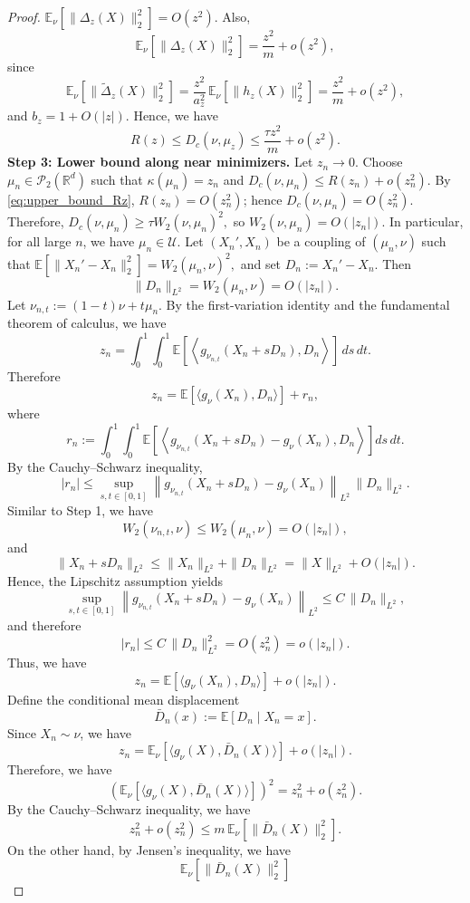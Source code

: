 \documentclass[11pt]{article}
\theoremstyle{definition}
\newcommand{\E}{\mathbb{E}}
\begin{document}
\begin{proof}
{\(\E_\nu[\|\Delta_z(X)\|_2^2]=O(z^2)\). Also,
\[
\E_\nu[\|\Delta_z(X)\|_2^2]
=
\frac{z^2}{m}+o(z^2),
\]
since
\[
\E_\nu[\|\widetilde\Delta_z(X)\|_2^2]
=
\frac{z^2}{a_z^2}\,\E_\nu[\|h_z(X)\|_2^2]
=
\frac{z^2}{m}+o(z^2),
\]
and \(b_z=1+O(|z|)\). Hence, we have
\begin{equation}
\label{eq:upper_bound_Rz}
R(z)\le D_c(\nu,\mu_z)
\le
\frac{\tau z^2}{m}+o(z^2).
\end{equation}
\medskip
\noindent
\textbf{Step 3: Lower bound along near minimizers.}
Let \(z_n\to0\). Choose \(\mu_n\in \mathcal P_2(\mathbb R^d)\) such that $\kappa(\mu_n)=z_n$ and $D_c(\nu,\mu_n)\le R(z_n)+o(z_n^2).$
By \eqref{eq:upper_bound_Rz}, $R(z_n)=O(z_n^2)$; 
hence $D_c(\nu,\mu_n)=O(z_n^2).$
Therefore, $D_c(\nu,\mu_n)\ge \tau W_2(\nu,\mu_n)^2,$
so $W_2(\nu,\mu_n)=O(|z_n|).$
In particular, for all large \(n\), we have \(\mu_n\in \mathcal U\).
Let \((X_n',X_n)\) be a coupling of \((\mu_n,\nu)\) such that $\E[\|X_n'-X_n\|_2^2]=W_2(\mu_n,\nu)^2,$
and set $D_n:=X_n'-X_n.$
Then
\[
\|D_n\|_{L^2}=W_2(\mu_n,\nu)=O(|z_n|).
\]
Let \(\nu_{n,t}:=(1-t)\nu+t\mu_n\). By the first-variation identity and the fundamental theorem
of calculus, we have 
\[
z_n
=
\int_0^1\int_0^1
\E\!\left[\left\langle g_{\nu_{n,t}}(X_n+sD_n),D_n\right\rangle\right]\,ds\,dt.
\]
Therefore
\[
z_n
=
\E\!\left[\langle g_\nu(X_n),D_n\rangle\right] + r_n,
\]
where
\[
r_n
:=
\int_0^1\int_0^1
\E\!\left[
\left\langle g_{\nu_{n,t}}(X_n+sD_n)-g_\nu(X_n),D_n\right\rangle
\right]ds\,dt.
\]
By the Cauchy--Schwarz inequality,
\[
|r_n|
\le
\sup_{s,t\in[0,1]}
\left\|g_{\nu_{n,t}}(X_n+sD_n)-g_\nu(X_n)\right\|_{L^2}
\,
\|D_n\|_{L^2}.
\]
Similar to Step 1, we have 
\[
W_2(\nu_{n,t},\nu)\le W_2(\mu_n,\nu)=O(|z_n|),
\]
and
\[
\|X_n+sD_n\|_{L^2}
\le
\|X_n\|_{L^2}+\|D_n\|_{L^2}
=
\|X\|_{L^2}+O(|z_n|).
\]
Hence, the Lipschitz assumption yields
\[
\sup_{s,t\in[0,1]}
\left\|g_{\nu_{n,t}}(X_n+sD_n)-g_\nu(X_n)\right\|_{L^2}
\le
C\,\|D_n\|_{L^2},
\]
and therefore
\[
|r_n|
\le
C\,\|D_n\|_{L^2}^2
=
O(z_n^2)
=
o(|z_n|).
\]
Thus, we have 
\[
z_n
=
\E\!\left[\langle g_\nu(X_n),D_n\rangle\right] + o(|z_n|).
\]
Define the conditional mean displacement
\[
\bar D_n(x):=\E[D_n\mid X_n=x].
\]
Since \(X_n\sim \nu\), we have 
\[
z_n
=
\E_\nu\!\left[\langle g_\nu(X),\bar D_n(X)\rangle\right]
+
o(|z_n|).
\]
Therefore, we have 
\[
\left(\E_\nu\!\left[\langle g_\nu(X),\bar D_n(X)\rangle\right]\right)^2
=
z_n^2+o(z_n^2).
\]
By the Cauchy--Schwarz inequality, we have 
\[
z_n^2+o(z_n^2)
\le
m\,\E_\nu[\|\bar D_n(X)\|_2^2].
\]
On the other hand, by Jensen's inequality, we have 
\[
\E_\nu[\|\bar D_n(X)\|_2^2]
\]}
\end{proof}
\end{document}
